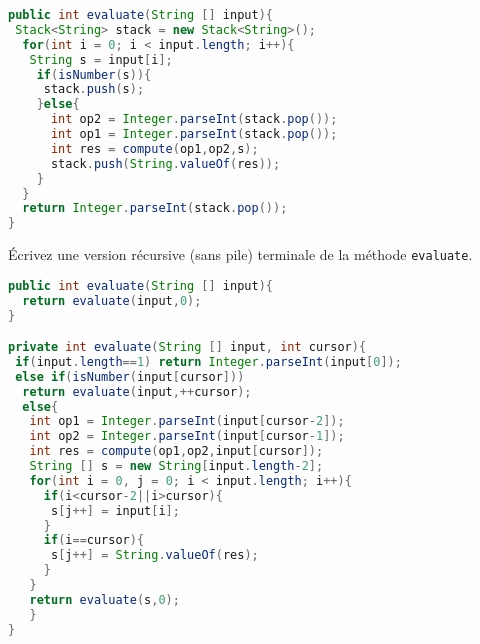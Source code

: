 \documentclass[iutinfo,a4paper,corrections,10pt]{ustl-tdtp}
\begin{document}
\begin{solution}
{\color{red}
\begin{lstlisting}[language=Java]
public int evaluate(String [] input){
 Stack<String> stack = new Stack<String>();
  for(int i = 0; i < input.length; i++){
   String s = input[i];
    if(isNumber(s)){
     stack.push(s);
    }else{
      int op2 = Integer.parseInt(stack.pop());
      int op1 = Integer.parseInt(stack.pop());
      int res = compute(op1,op2,s);
      stack.push(String.valueOf(res));
    }
  }
  return Integer.parseInt(stack.pop());
}
\end{lstlisting}
}
\end{solution}

\question Écrivez une version récursive (sans pile) terminale de la méthode \texttt{evaluate}.

\begin{solution}
{\color{red}
\begin{lstlisting}[language=Java]
public int evaluate(String [] input){
  return evaluate(input,0);
}

private int evaluate(String [] input, int cursor){
 if(input.length==1) return Integer.parseInt(input[0]);
 else if(isNumber(input[cursor]))
  return evaluate(input,++cursor);
  else{ 
   int op1 = Integer.parseInt(input[cursor-2]);
   int op2 = Integer.parseInt(input[cursor-1]);
   int res = compute(op1,op2,input[cursor]);
   String [] s = new String[input.length-2];
   for(int i = 0, j = 0; i < input.length; i++){
     if(i<cursor-2||i>cursor){
	  s[j++] = input[i];
     }
     if(i==cursor){
      s[j++] = String.valueOf(res);
     }
   }
   return evaluate(s,0);
   }
}
\end{lstlisting}
}
\end{solution}
\end{document}
